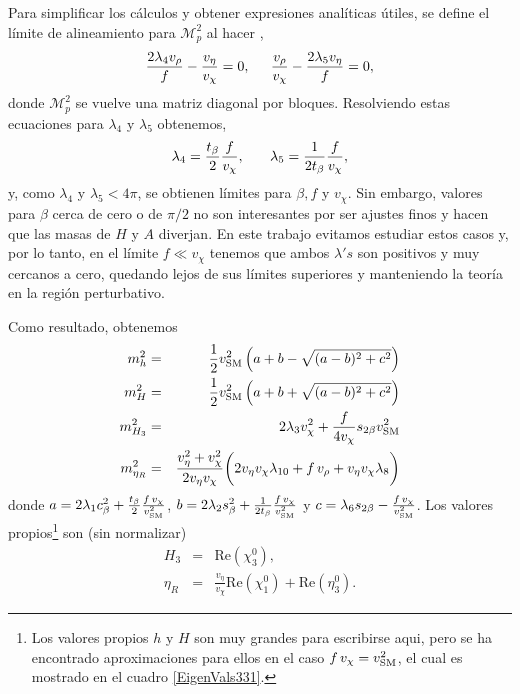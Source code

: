 Para simplificar los cálculos y obtener expresiones analíticas útiles, se define el límite de alineamiento para $\mathcal{M}_p^2$ al hacer \cite{Okada:2016whh},
\begin{equation}
\frac{2 {\lambda_ 4} {v_\rho }}{{f}} -\frac{{v_\eta }}{{v_\chi }} =0, \hspace{0.2in} \frac{{v_\rho }}{{v_\chi }} - \frac{2 {\lambda_ 5} {v_\eta }}{{f}} =0,
\label{alignment}
\end{equation}
donde $\mathcal{M}_{p}^2$ se vuelve una matriz diagonal por bloques. Resolviendo estas ecuaciones para $\lambda_4$ y $\lambda_5$ obtenemos,
\begin{equation}
\lambda_4 = \frac{t_\beta}{2} \frac{f}{v_\chi}, \hspace{0.25in} \lambda_5 = \frac{1}{2t_\beta} \frac{f}{v_\chi},
\end{equation}
y, como $\lambda_4$ y $\lambda_5 < 4\pi$, se obtienen límites para $\beta, f$ y $v_\chi$. Sin embargo, valores para $\beta$ cerca de cero o de $\pi/2$ no son interesantes por ser ajustes finos y hacen que las masas de $H$ y $A$ diverjan. En este trabajo evitamos estudiar estos casos y, por lo tanto, en el límite $f\ll v_\chi$ tenemos que ambos $\lambda's$ son positivos y muy cercanos a cero, quedando lejos de sus límites superiores y manteniendo la teoría en la región perturbativo.

Como resultado, obtenemos
\begin{eqnarray}
m_h^2 &=& \frac{1}{2}v_{\rm SM}^2 \left(a+b-\sqrt{(a-b)^2+c^2} \right) \nonumber \\
m_H^2 &=& \frac{1}{2}v_{\rm SM}^2 \left(a+b+\sqrt{(a-b)^2+c^2} \right) \nonumber \\
m_{H_3}^2 &=& 2\lambda_3 v_\chi^2 + \frac{f}{4v_\chi}s_{2\beta}  v_{\rm SM}^2 \nonumber \\
m_{\eta_R}^2 &=& \frac{v_\eta^2 + v_\chi^2}{2v_\eta v_\chi} \bigg( 2v_\eta v_\chi \lambda_{10} + f\,v_\rho + v_\eta v_\chi \lambda_8 \bigg)
\end{eqnarray}
donde $a= 2\lambda_1 c_\beta^2+ \frac{t_\beta}{2}  \frac{f \, v_\chi}{v_{\rm SM}^2}$, $b=2\lambda_2 s_\beta^2+ \frac{1}{2t_\beta} \frac{f \, v_\chi}{v_{\rm SM}^2}$ y $c=  \lambda_6 s_{2\beta}-  \frac{f \, v_\chi}{v_{\rm SM}^2}$. Los valores propios\footnote{Los valores propios $h$ y $H$ son muy grandes para escribirse aqui, pero se ha encontrado aproximaciones para ellos en el caso $f\, v_\chi = v_{\rm SM}^2$, el cual es mostrado en el cuadro \ref{EigenVals331}.} son (sin normalizar)
\begin{eqnarray}
H_3 &=& \text{Re}(\chi_3^0), \nonumber \\
\eta_R &=& \frac{v_\eta}{v_\chi} \text{Re}(\chi_1^0) + \text{Re}(\eta_3^0).
\end{eqnarray}

